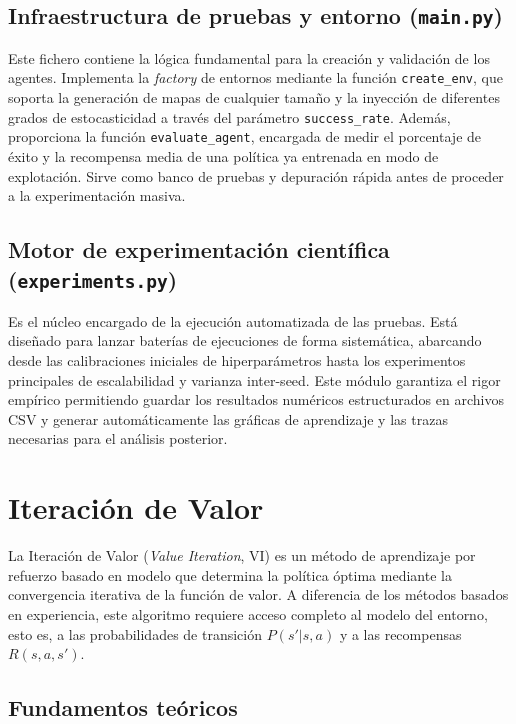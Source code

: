 \documentclass[11pt,a4paper]{article}
\begin{document}
\subsection{Infraestructura de pruebas y entorno (\texttt{main.py})}

Este fichero contiene la lógica fundamental para la creación y validación de los agentes. Implementa la \emph{factory} de entornos mediante la función \texttt{create\_env}, que soporta la generación de mapas de cualquier tamaño y la inyección de diferentes grados de estocasticidad a través del parámetro \texttt{success\_rate}. Además, proporciona la función \texttt{evaluate\_agent}, encargada de medir el porcentaje de éxito y la recompensa media de una política ya entrenada en modo de explotación. Sirve como banco de pruebas y depuración rápida antes de proceder a la experimentación masiva.

\subsection{Motor de experimentación científica (\texttt{experiments.py})}

Es el núcleo encargado de la ejecución automatizada de las pruebas. Está diseñado para lanzar baterías de ejecuciones de forma sistemática, abarcando desde las calibraciones iniciales de hiperparámetros hasta los experimentos principales de escalabilidad y varianza inter-seed. Este módulo garantiza el rigor empírico permitiendo guardar los resultados numéricos estructurados en archivos CSV y generar automáticamente las gráficas de aprendizaje y las trazas necesarias para el análisis posterior.

\section{Iteración de Valor}

La Iteración de Valor (\emph{Value Iteration}, VI) es un método de aprendizaje por refuerzo basado en modelo que determina la política óptima mediante la convergencia iterativa de la función de valor. A diferencia de los métodos basados en experiencia, este algoritmo requiere acceso completo al modelo del entorno, esto es, a las probabilidades de transición $P(s'|s,a)$ y a las recompensas $R(s,a,s')$.

\subsection{Fundamentos teóricos}
\end{document}
